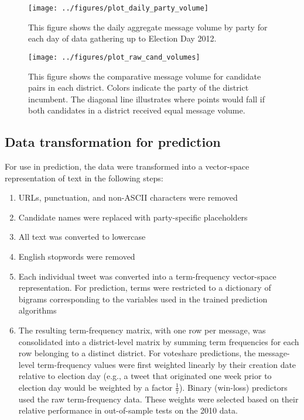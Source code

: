 \documentclass[11pt]{article}
\begin{document}
\begin{figure}[ht]
  \centering
  \texttt{[image: ../figures/plot\_daily\_party\_volume]}
  \caption{This figure shows the daily aggregate message volume by party for each day of data gathering up to Election Day 2012. }
  \label{fig:daily-msg-volume}
\end{figure}

\begin{figure}[ht]
  \centering
  \texttt{[image: ../figures/plot\_raw\_cand\_volumes]}
  \caption{This figure shows the comparative message volume for
    candidate pairs in each district. Colors indicate the party of the
    district incumbent. The diagonal line illustrates where points would fall if both candidates in a district received equal message volume.}
  \label{fig:cand-msg-volume}
\end{figure}


\subsection{Data transformation for prediction}
\label{sec:data-transf-pred}

For use in prediction, the data were transformed into a vector-space
representation of text in the following steps:
\begin{enumerate}
\item URLs, punctuation, and non-ASCII characters were removed
\item Candidate names were replaced with party-specific placeholders
\item All text was converted to lowercase
\item English stopwords were removed
\item Each individual tweet was converted into a term-frequency
  vector-space representation. For prediction, terms were restricted
  to a dictionary of bigrams corresponding to the variables used in
  the trained prediction algorithms
\item The resulting term-frequency matrix, with one row per message,
  was consolidated into a district-level matrix by summing term
  frequencies for each row belonging to a distinct district. For
  voteshare predictions, the message-level term-frequency values were
  first weighted linearly by their creation date relative to election
  day (e.g., a tweet that originated one week prior to election day
  would be weighted by a factor $\frac{1}{7}$). Binary (win-loss)
  predictors used the raw term-frequency data. These weights were
  selected based on their relative performance in out-of-sample tests
  on the 2010 data. 
\end{enumerate}
\end{document}
